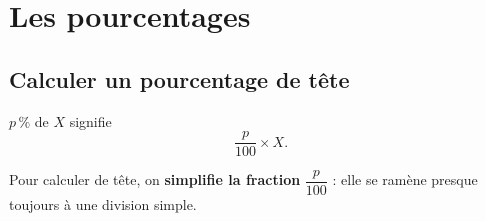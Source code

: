 \section[Les pourcentages]{Les pourcentages }

\subsection{Calculer un pourcentage de tête}

\begin{theorie}
\textquotedbl{}$p\,\%$ de $X$\textquotedbl{} signifie
\[ \frac{p}{100} \times X. \]

Pour calculer de tête, on \textbf{simplifie la fraction} $\dfrac{p}{100}$ : elle se
ramène presque toujours à une division simple.
\end{theorie}


